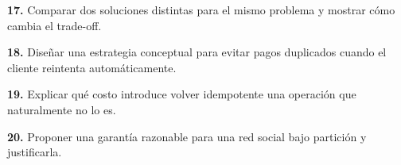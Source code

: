\documentclass[variant=guia,cover=institutional,mode=screen]{ua-engineering-v6-article}
\begin{document}
\begin{uaexercise}
\textbf{17.}
Comparar dos soluciones distintas para el mismo problema y mostrar cómo cambia el trade-off.
\end{uaexercise}

\begin{uaexercise}
\textbf{18.}
Diseñar una estrategia conceptual para evitar pagos duplicados cuando el cliente reintenta automáticamente.
\end{uaexercise}

\begin{uaexercise}
\textbf{19.}
Explicar qué costo introduce volver idempotente una operación que naturalmente no lo es.
\end{uaexercise}

\begin{uaexercise}
\textbf{20.}
Proponer una garantía razonable para una red social bajo partición y justificarla.
\end{uaexercise}
\end{document}
